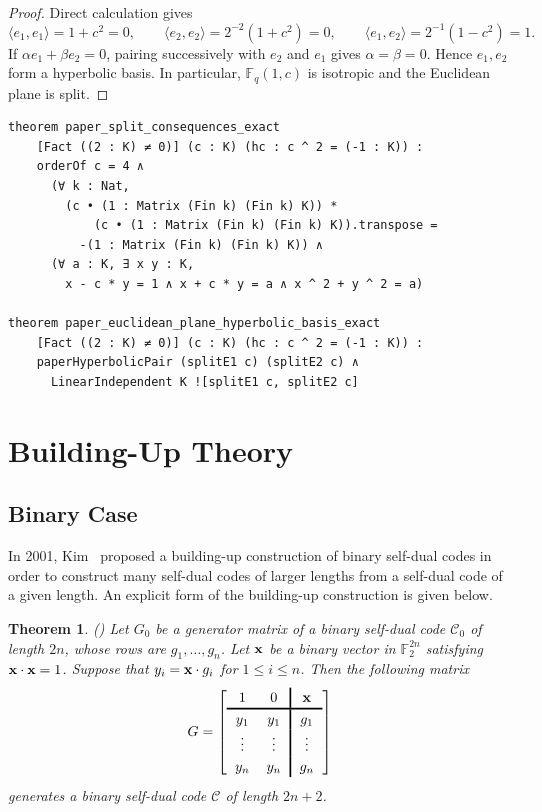 \documentclass[12pt]{article}
\newtheorem{theorem}{Theorem}[section]
\newcommand{\F}{\mathbb{F}}
\begin{document}
\begin{proof}
Direct calculation gives
\[
\langle e_1,e_1\rangle=1+c^2=0,
\qquad
\langle e_2,e_2\rangle=2^{-2}(1+c^2)=0,
\qquad
\langle e_1,e_2\rangle=2^{-1}(1-c^2)=1.
\]
If \(\alpha e_1+\beta e_2=0\), pairing successively with \(e_2\) and
\(e_1\) gives \(\alpha=\beta=0\). Hence \(e_1,e_2\) form a hyperbolic
basis. In particular, \(\F_q(1,c)\) is isotropic and the Euclidean plane is
split.
\end{proof}

\begin{lstlisting}[caption={Lean for Proposition~\ref{prop:split-consequences} and Proposition~\ref{prop:eucl-hyp}.}]
theorem paper_split_consequences_exact
    [Fact ((2 : K) ≠ 0)] (c : K) (hc : c ^ 2 = (-1 : K)) :
    orderOf c = 4 ∧
      (∀ k : Nat,
        (c • (1 : Matrix (Fin k) (Fin k) K)) *
            (c • (1 : Matrix (Fin k) (Fin k) K)).transpose =
          -(1 : Matrix (Fin k) (Fin k) K)) ∧
      (∀ a : K, ∃ x y : K,
        x - c * y = 1 ∧ x + c * y = a ∧ x ^ 2 + y ^ 2 = a)

theorem paper_euclidean_plane_hyperbolic_basis_exact
    [Fact ((2 : K) ≠ 0)] (c : K) (hc : c ^ 2 = (-1 : K)) :
    paperHyperbolicPair (splitE1 c) (splitE2 c) ∧
      LinearIndependent K ![splitE1 c, splitE2 c]
\end{lstlisting}

\section{Building-Up Theory}
\label{sec:building-up}

\subsection{Binary Case}

In 2001, Kim~\cite{Kim2001} proposed a building-up construction of binary self-dual codes in order to construct many self-dual codes of larger lengths from a self-dual code of a given length. An explicit form of the building-up construction is given below.

\begin{theorem}(\cite[Theorem 1]{Kim2001}) \label{thm-binary-build-1}
Let $G_0$ be a generator matrix of a binary self-dual code
$\mathcal C_0$ of length $2n$, whose rows are $g_1, \dots, g_n$. Let
$\bf x$ be a binary vector in $\mathbb F_2^{2n}$ satisfying
${\bf x}\cdot{\bf x}=1$. Suppose that $y_i={\bf x}\cdot g_i$ for
$1\le i\le n$. Then the following matrix
\[
\begingroup
\setlength{\arraycolsep}{6pt}
\renewcommand{\arraystretch}{1.2}
G=
\left[
\begin{array}{cc!{\vrule width 1.2pt}c}
1 & 0 & \mathbf{x}\\
\noalign{\hrule height 1.2pt}
y_1 & y_1 & g_1\\
\vdots & \vdots & \vdots\\
y_n & y_n & g_n
\end{array}
\right]
\endgroup
\]
generates a binary self-dual code $\mathcal C$ of length $2n+2$.
\end{theorem}
\end{document}
